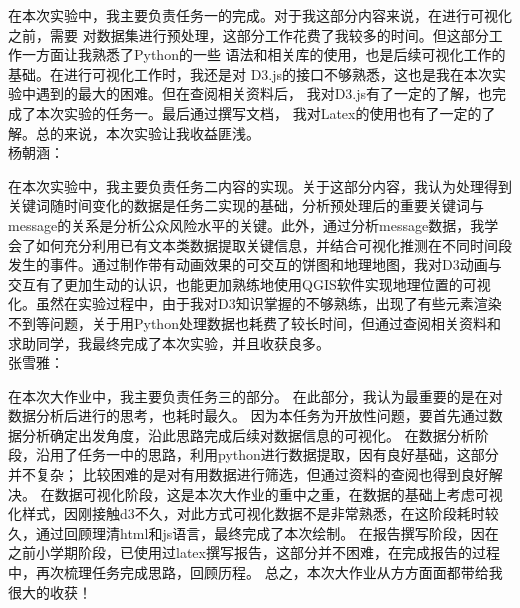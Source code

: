 \documentclass[a4paper]{article}
\begin{document}
在本次实验中，我主要负责任务一的完成。对于我这部分内容来说，在进行可视化之前，需要
对数据集进行预处理，这部分工作花费了我较多的时间。但这部分工作一方面让我熟悉了Python的一些
语法和相关库的使用，也是后续可视化工作的基础。在进行可视化工作时，我还是对
D3.js的接口不够熟悉，这也是我在本次实验中遇到的最大的困难。但在查阅相关资料后，
我对D3.js有了一定的了解，也完成了本次实验的任务一。最后通过撰写文档，
我对Latex的使用也有了一定的了解。总的来说，本次实验让我收益匪浅。
\\

杨朝涵：

在本次实验中，我主要负责任务二内容的实现。关于这部分内容，我认为处理得到关键词随时间变化的数据是任务二实现的基础，分析预处理后的重要关键词与message的关系是分析公众风险水平的关键。此外，通过分析message数据，我学会了如何充分利用已有文本类数据提取关键信息，并结合可视化推测在不同时间段发生的事件。通过制作带有动画效果的可交互的饼图和地理地图，我对D3动画与交互有了更加生动的认识，也能更加熟练地使用QGIS软件实现地理位置的可视化。虽然在实验过程中，由于我对D3知识掌握的不够熟练，出现了有些元素渲染不到等问题，关于用Python处理数据也耗费了较长时间，但通过查阅相关资料和求助同学，我最终完成了本次实验，并且收获良多。
\\

张雪雅：

在本次大作业中，我主要负责任务三的部分。
在此部分，我认为最重要的是在对数据分析后进行的思考，也耗时最久。
因为本任务为开放性问题，要首先通过数据分析确定出发角度，沿此思路完成后续对数据信息的可视化。
在数据分析阶段，沿用了任务一中的思路，利用python进行数据提取，因有良好基础，这部分并不复杂；
比较困难的是对有用数据进行筛选，但通过资料的查阅也得到良好解决。
在数据可视化阶段，这是本次大作业的重中之重，在数据的基础上考虑可视化样式，因刚接触d3不久，对此方式可视化数据不是非常熟悉，在这阶段耗时较久，通过回顾理清html和js语言，最终完成了本次绘制。
在报告撰写阶段，因在之前小学期阶段，已使用过latex撰写报告，这部分并不困难，在完成报告的过程中，再次梳理任务完成思路，回顾历程。
总之，本次大作业从方方面面都带给我很大的收获！
\newpage

\end{document}
